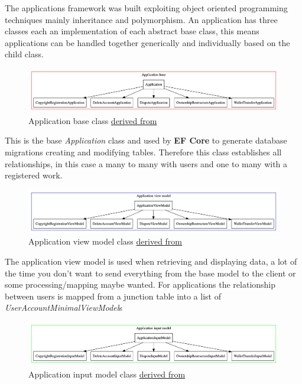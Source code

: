 The applications framework was built exploiting object oriented programming techniques mainly inheritance and polymorphism. An application has three classes each an implementation of each abstract base class, this means applications can be handled together generically and individually based on the child class.

\begin{figure}[H]
\caption{Application base class \href{https://github.com/MrHarrisonBarker/CRPL/blob/main/CRPL.Data/Applications/DataModels/Application.cs}{derived from}}
\centering
\includegraphics[width=\textwidth,height=0.5\textheight,keepaspectratio]{images/operational/application-base}
\end{figure}

This is the base \textit{Application} class and used by \textbf{EF Core} to generate database migrations creating and modifying tables. Therefore this class establishes all relationships, in this case a many to many with users and one to many with a registered work.

\begin{figure}[H]
\caption{Application view model class \href{https://github.com/MrHarrisonBarker/CRPL/blob/main/CRPL.Data/Applications/ViewModels/ApplicationViewModel.cs}{derived from}}
\centering
\includegraphics[width=\textwidth,height=0.5\textheight,keepaspectratio]{images/operational/application-view}
\end{figure}

The application view model is used when retrieving and displaying data, a lot of the time you don't want to send everything from the base model to the client or some processing/mapping maybe wanted. For applications the relationship between users is mapped from a junction table into a list of \textit{UserAccountMinimalViewModel}s
 
\begin{figure}[H]
\caption{Application input model class \href{https://github.com/MrHarrisonBarker/CRPL/blob/main/CRPL.Data/Applications/InputModels/ApplicationInputModel.cs}{derived from}}
\centering
\includegraphics[width=\textwidth,height=0.5\textheight,keepaspectratio]{images/operational/application-input}
\end{figure}

